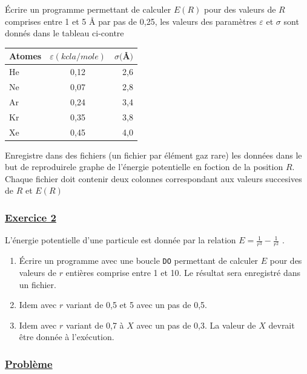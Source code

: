 \documentclass[a4paper, 11pt]{report}
\begin{document}
\noindent
Écrire un programme permettant de calculer $E(R)$ pour des valeurs de $R$ comprises entre 1 et 5 \AA \hspace{0,05 cm} par pas de 0,25, les valeurs des paramètres $\varepsilon$ et $\sigma$ sont donnés dans le tableau ci-contre 


\begin{table}[h]
  \begin{flushright}
  \begin{tabular}{||l c r||}
    \hline
    \hline
    Atomes & $\varepsilon(kcla/mole)$ & $\sigma($\AA$)$ \\
    \hline
    \hline
    He & 0,12 & 2,6 \\
    Ne & 0,07 & 2,8 \\
    Ar & 0,24 & 3,4 \\ 
    Kr & 0,35 & 3,8 \\
    Xe & 0,45 & 4,0 \\
    \hline
    \hline
  \end{tabular}
  \end{flushright}
\end{table}

\noindent
Enregistre dans des fichiers (un fichier par élément gaz rare) les données dans le but de reproduirele graphe de l'énergie potentielle en foction de la position $R$. \\
Chaque fichier doit contenir deux colonnes correspondant aux valeurs succesives de $R$ et $E(R)$

\subsubsection{\underline{Exercice 2}}

\noindent
L'énergie potentielle d'une particule est donnée par la relation $ E = \frac{1}{r^3} - \frac{1}{r^2} $ .

\begin{enumerate}
  \item[(a)] Écrire un programme avec une boucle \verb|DO| permettant de calculer $E$ pour des valeurs de $r$ entières comprise entre 1 et 10. Le résultat sera enregistré dans un fichier.
  \item[(b)] Idem avec $r$ variant de 0,5 et 5 avec un pas de 0,5.
  \item[(c)] Idem avec $r$ variant de 0,7 à $X$ avec un pas de 0,3. La valeur de $X$ devrait être donnée à l'exécution.
\end{enumerate}

\subsubsection{\underline{Problème}}
\end{document}
